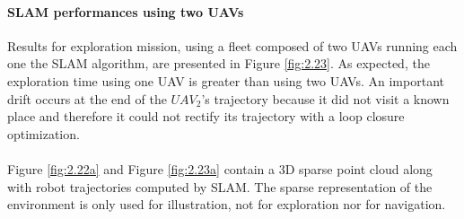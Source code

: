 \paragraph{SLAM performances using two UAVs}
Results for exploration mission, using a ﬂeet composed of two UAVs running each one the SLAM algorithm, are presented in Figure \ref{fig:2.23}. As expected, the exploration time using one UAV is greater than using two UAVs. An important drift occurs at the end of the $UAV_2$'s trajectory because it did not visit a known place and therefore it could not rectify its trajectory with a loop closure optimization.\\\\
Figure \ref{fig:2.22a} and Figure \ref{fig:2.23a} contain a 3D sparse point cloud along with robot trajectories computed by SLAM. The sparse representation of the environment is only used for illustration, not for exploration nor for navigation.
